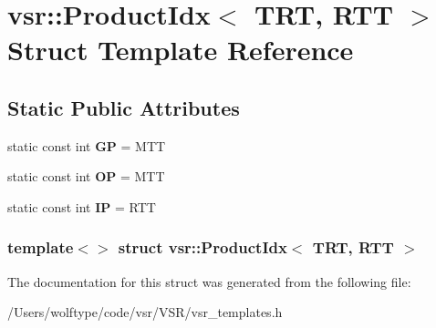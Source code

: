 \hypertarget{structvsr_1_1_product_idx_3_01_t_r_t_00_01_r_t_t_01_4}{\section{vsr\-:\-:Product\-Idx$<$ T\-R\-T, R\-T\-T $>$ Struct Template Reference}
\label{structvsr_1_1_product_idx_3_01_t_r_t_00_01_r_t_t_01_4}
}
\subsection*{Static Public Attributes}
\begin{DoxyCompactItemize}
\item 
\hypertarget{structvsr_1_1_product_idx_3_01_t_r_t_00_01_r_t_t_01_4_a2585cfd7cfd9ca77743b19e9d08a1e21}{static const int {\bfseries G\-P} = M\-T\-T}\label{structvsr_1_1_product_idx_3_01_t_r_t_00_01_r_t_t_01_4_a2585cfd7cfd9ca77743b19e9d08a1e21}

\item 
\hypertarget{structvsr_1_1_product_idx_3_01_t_r_t_00_01_r_t_t_01_4_a22ceba482096a644b986450e1cb2fb6c}{static const int {\bfseries O\-P} = M\-T\-T}\label{structvsr_1_1_product_idx_3_01_t_r_t_00_01_r_t_t_01_4_a22ceba482096a644b986450e1cb2fb6c}

\item 
\hypertarget{structvsr_1_1_product_idx_3_01_t_r_t_00_01_r_t_t_01_4_ae4257c0c65359760fd7185288ad58f14}{static const int {\bfseries I\-P} = R\-T\-T}\label{structvsr_1_1_product_idx_3_01_t_r_t_00_01_r_t_t_01_4_ae4257c0c65359760fd7185288ad58f14}

\end{DoxyCompactItemize}
\subsubsection*{template$<$$>$ struct vsr\-::\-Product\-Idx$<$ T\-R\-T, R\-T\-T $>$}



The documentation for this struct was generated from the following file\-:\begin{DoxyCompactItemize}
\item 
/\-Users/wolftype/code/vsr/\-V\-S\-R/vsr\-\_\-templates.\-h\end{DoxyCompactItemize}
